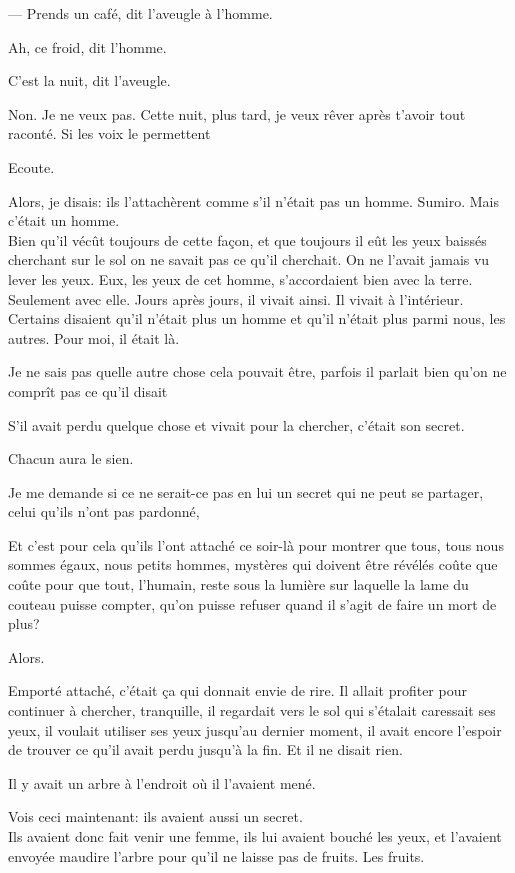 --- Prends un café, dit l'aveugle à l'homme.

Ah, ce froid, dit l'homme.

C'est la nuit, dit l'aveugle.

Non. Je ne veux pas. Cette nuit, plus tard, je veux rêver après t'avoir
tout raconté. Si les voix le permettent

Ecoute.

Alors, je disais: ils l'attachèrent comme s'il n'était pas un homme.
Sumiro. Mais c'était un homme.\\

Bien qu'il vécût toujours de cette façon, et que toujours il eût les
yeux baissés cherchant sur le sol on ne savait pas ce qu'il cherchait.
On ne l'avait jamais vu lever les yeux. Eux, les yeux de cet homme,
s'accordaient bien avec la terre. Seulement avec elle. Jours après
jours, il vivait ainsi. Il vivait à l'intérieur. Certains disaient qu'il
n'était plus un homme et qu'il n'était plus parmi nous, les autres. Pour
moi, il était là.

Je ne sais pas quelle autre chose cela pouvait être, parfois il parlait
bien qu'on ne comprît pas ce qu'il disait

S'il avait perdu quelque chose et vivait pour la chercher, c'était son
secret.

Chacun aura le sien.

Je me demande si ce ne serait-ce pas en lui un secret qui ne peut se
partager, celui qu'ils n'ont pas pardonné,

Et c'est pour cela qu'ils l'ont attaché ce soir-là pour montrer que
tous, tous nous sommes égaux, nous petits hommes, mystères qui doivent
être révélés coûte que coûte pour que tout, l'humain, reste sous la
lumière sur laquelle la lame du couteau puisse compter, qu'on puisse
refuser quand il s'agit de faire un mort de plus?

Alors.

Emporté attaché, c'était ça qui donnait envie de rire. Il allait
profiter pour continuer à chercher, tranquille, il regardait vers le sol
qui s'étalait caressait ses yeux, il voulait utiliser ses yeux jusqu'au
dernier moment, il avait encore l'espoir de trouver ce qu'il avait perdu
jusqu'à la fin. Et il ne disait rien.

Il y avait un arbre à l'endroit où il l'avaient mené.

Vois ceci maintenant: ils avaient aussi un secret.\\

Ils avaient donc fait venir une femme, ils lui avaient bouché les yeux,
et l'avaient envoyée maudire l'arbre pour qu'il ne laisse pas de fruits.
Les fruits.

